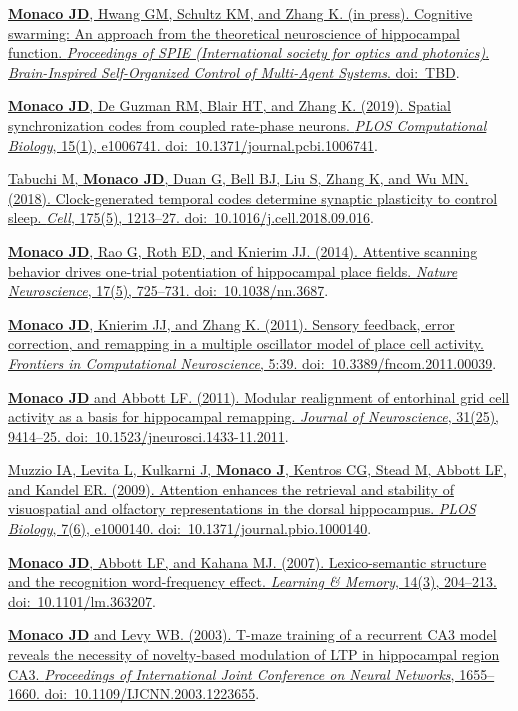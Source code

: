\documentclass[10pt]{article}
\begin{document}
\begin{description}
\item \href{https://spie.org/SI/conferencedetails/micro-nanotechnology-sensors-systems-applications?SSO=1#session-15}{\textbf{Monaco JD}, Hwang GM, Schultz KM, and Zhang K. (in press). Cognitive swarming: An approach from the theoretical neuroscience of hippocampal function. \emph{Proceedings of SPIE (International society for optics and photonics)}. \emph{Brain-Inspired Self-Organized Control of Multi-Agent Systems}. doi:~TBD}.
\item \href{https://doi.org/10.1371/journal.pcbi.1006741}{\textbf{Monaco JD}, De Guzman RM, Blair HT, and Zhang K. (2019). Spatial synchronization codes from coupled rate-phase neurons. \emph{PLOS Computational Biology}, 15(1), e1006741. doi:~10.1371/journal.pcbi.1006741}.
\item \href{https://www.cell.com/cell/fulltext/S0092-8674(18)31228-5}{Tabuchi M, \textbf{Monaco JD}, Duan G, Bell BJ, Liu S, Zhang K, and Wu MN. (2018). Clock-generated temporal codes determine synaptic plasticity to control sleep. \emph{Cell}, 175(5), 1213--27. doi:~10.1016/j.cell.2018.09.016}.
\item \href{http://dx.doi.org/10.1038/nn.3687}{\textbf{Monaco JD}, Rao G, Roth ED, and Knierim JJ. (2014). Attentive scanning behavior drives one-trial potentiation of hippocampal place fields. \emph{Nature Neuroscience}, 17(5), 725--731. doi:~10.1038/nn.3687}.
\item \href{http://dx.doi.org/10.3389/fncom.2011.00039}{\textbf{Monaco JD}, Knierim JJ, and Zhang K. (2011). Sensory feedback, error correction, and remapping in a multiple oscillator model of place cell activity. \emph{Frontiers in Computational Neuroscience}, 5:39. doi:~10.3389/fncom.2011.00039}.
\item \href{http://dx.doi.org/10.1523/JNEUROSCI.1433-11.2011}{\textbf{Monaco JD} and Abbott LF. (2011). Modular realignment of entorhinal grid cell activity as a basis for hippocampal remapping. \emph{Journal of Neuroscience}, 31(25), 9414--25. doi:~10.1523/jneurosci.1433-11.2011}.
\item \href{http://dx.doi.org/10.1371/journal.pbio.1000140}{Muzzio IA, Levita L, Kulkarni J, \textbf{Monaco J}, Kentros CG, Stead M, Abbott LF, and Kandel ER. (2009). Attention enhances the retrieval and stability of visuospatial and olfactory representations in the dorsal hippocampus. \emph{PLOS Biology}, 7(6), e1000140. doi:~10.1371/journal.pbio.1000140}.
\item \href{http://dx.doi.org/10.1101/lm.363207}{\textbf{Monaco JD}, Abbott LF, and Kahana MJ. (2007). Lexico-semantic structure and the recognition word-frequency effect. \emph{Learning \& Memory}, 14(3), 204--213. doi:~10.1101/lm.363207}.
\item \href{http://dx.doi.org/10.1109/IJCNN.2003.1223655}{\textbf{Monaco JD} and Levy WB. (2003). T-maze training of a recurrent CA3 model reveals the necessity of novelty-based modulation of LTP in hippocampal region CA3. \emph{Proceedings of International Joint Conference on Neural Networks}, 1655--1660. doi:~10.1109/IJCNN.2003.1223655}.
\end{description}
\end{document}
